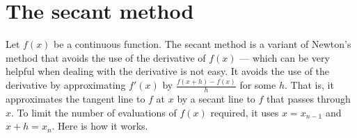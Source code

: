 \section{The secant method}
Let $f(x)$ be a continuous function. The secant method is a variant of 
Newton's method that avoids the use of the derivative of $f(x)$ --- which can be very helpful when dealing with the derivative is not easy. It avoids the use of the derivative  by approximating  $f'(x)$ by $\frac{f(x+h)-f(x)}{h}$ for some $h$. That is, it approximates the tangent line to $f$ at $x$ by a secant line 
to $f$ that passes through $x$. To limit the number of evaluations of $f(x)$ required, it uses $x=x_{n-1}$ and $x+h=x_n$. Here is how it works.

